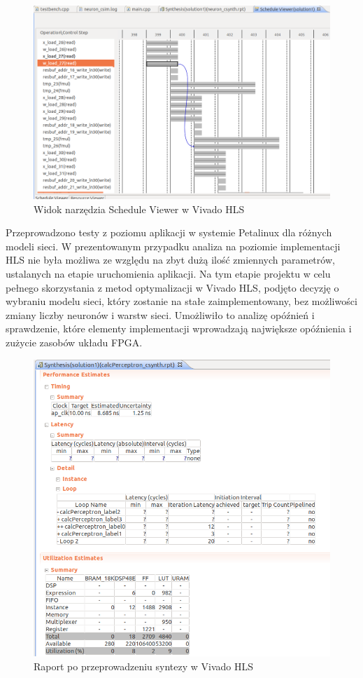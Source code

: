 \begin{figure}[!h]
  \centering
  \includegraphics[width=\textwidth]{img/scheduler.png}
  \caption{Widok narzędzia Schedule Viewer w Vivado HLS}
  \label{scheduler}
\end{figure}

Przeprowadzono testy z poziomu aplikacji w systemie Petalinux dla różnych modeli sieci.
W prezentowanym przypadku analiza na poziomie implementacji HLS nie była możliwa ze względu na zbyt dużą ilość zmiennych parametrów, ustalanych na etapie uruchomienia aplikacji. Na tym etapie projektu w celu pełnego skorzystania z metod optymalizacji w Vivado HLS, podjęto decyzję o wybraniu modelu sieci, który zostanie na stałe zaimplementowany, bez możliwości zmiany liczby neuronów i warstw sieci. Umożliwiło to analizę opóźnień i sprawdzenie, które elementy implementacji wprowadzają największe opóźnienia i zużycie zasobów układu FPGA. 


\begin{figure}
  \centering
  \includegraphics[width=\textwidth]{img/hls-report.png}
  \caption{Raport po przeprowadzeniu syntezy w Vivado HLS}
  \label{hls-report}
\end{figure}

